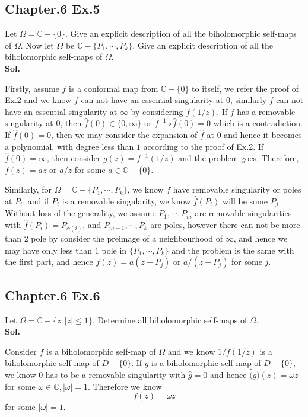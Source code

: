 \documentclass[lang=en,11pt,a4paper,citestyle =authoryear]{elegantpaper}
\newcommand{\C}{\mathbb{C}}
\begin{document}
\subsection*{Chapter.6 Ex.5} 
Let $\Omega = \C-\{0\}$. Give an explicit description of all the biholomorphic self-maps of $\Omega$. Now let $\Omega$ be $\C-\{P_1,\cdots,P_k\}$. Give an explicit description of all the biholomorphic self-maps of $\Omega$.
\vspace{0.5em}\\
\textbf{Sol.} \par
Firstly, assume $f$ is a conformal map from $\C-\{0\}$ to itself, we refer the proof of Ex.2 and we know $f$ can not have an essential singularity at $0$, similarly $f$ can not have an essential singularity at $\infty$ by considering $f(1/z)$. If $f$ has a removable singularity at $0$, then $\hat{f}(0) \in \{0,\infty\}$ or $f^{-1}\circ\hat{f}(0) = 0$ which is a contradiction. If $\hat{f}(0) = 0$, then we may consider the expansion of $\hat{f}$ at $0$ and hence it becomes a polynomial, with degree less than $1$ according to the proof of Ex.2. If $\hat{f}(0) = \infty$, then consider $g(z) = f^{-1}(1/z)$ and the problem goes. Therefore, $f(z) = az$ or $a/z$ for some $a\in\C-\{0\}$.\par
Similarly, for $\Omega = \C-\{P_1,\cdots,P_k\}$, we know $f$ have removable singularity or poles at $P_i$, and if $P_i$ is a removable singularity, we know $\hat{f}(P_i)$ will be some $P_j$. Without loss of the generality, we assume $P_1,\cdots,P_m$ are removable singularities with $\hat{f}(P_i) = P_{\phi(i)}$, and $P_{m+1},\cdots,P_k$ are poles, however there can not be more than $2$ pole by consider the preimage of a neighbourhood of $\infty$, and hence we may have only less than $1$ pole in $\{P_1,\cdots,P_k\}$ and the problem is the same with the first part, and hence $f(z) = a(z-P_j)$ or $a/(z-P_j)$ for some $j$.
\vspace{0.5em}

\subsection*{Chapter.6 Ex.6} 
Let $\Omega = \C-\{z:|z|\leq 1\}$. Determine all biholomorphic self-maps of $\Omega$.
\vspace{0.5em}\\
\textbf{Sol.} \par
Consider $f$ is a biholomorphic self-map of $\Omega$ and we know $1/f(1/z)$ is a biholomorphic self-map of $D-\{0\}$. If $g$ is a biholomorphic self-map of $D-\{0\}$, we know $0$ has to be a removable singularity with $\hat{g} = 0$ and hence $\hat(g)(z) = \omega z$ for some $\omega \in \C, |\omega| = 1$. Therefore we know
\[
f(z) = \omega z
\]
for some $|\omega| = 1$.
\vspace{0.5em}
\end{document}
